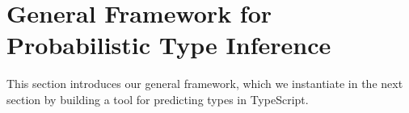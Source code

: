 \documentclass[sigplan,10pt,anonymous]{acmart} %
\newcommand{\margincomment}[2]{\marginpar{\scriptsize\color{Maroon}#1 says: #2}}
\newcommand{\adg}[1]{\margincomment{ADG}{#1}}
\theoremstyle{plain}
\theoremstyle{remark}
\theoremstyle{definition}
\begin{document}
\section{General Framework for Probabilistic Type Inference} \label{sec:framework}
%   

This section introduces our general framework,
which we instantiate in the next section by building a tool for
predicting types in TypeScript.
%
\end{document}
